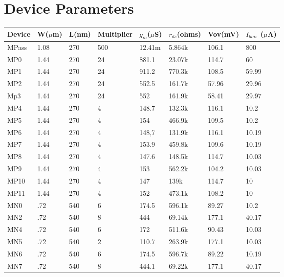 \documentclass{report}
\begin{document}
    \section{Device Parameters}
    \begin{center}
        \begin{tabular}{|m{4em}|m{3em}|m{3em}| m{4em}| m{4em}| m{4em}| m{4em} |m{4em} |}
            \hline
            Device & W($\mu$m) & L(nm) & Multiplier & $g_m$($\mu$S) & $r_{ds}$(ohms) & Vov(mV) & $I_{bias}$ ($\mu$A) \\
            \hline
            MPass & 1.08 & 270 & 500 & 12.41m & 5.864k & 106.1 & 800
            \\
            \hline
            MP0 & 1.44 & 270 & 24 & 881.1 & 23.07k & 114.7 & 60
            \\
            \hline
            MP1 & 1.44 & 270 & 24 & 911.2 & 770.3k & 108.5 & 59.99
            \\
            \hline
            MP2 & 1.44 & 270 & 24 & 552.5 & 161.7k & 57.96 & 29.96
            \\
            \hline
            Mp3 & 1.44 & 270 & 24 & 552 & 161.9k & 58.41 & 29.97
            \\
            \hline
            MP4 & 1.44 & 270 & 4 & 148.7 & 132.3k & 116.1 & 10.2
            \\
            \hline
            MP5 & 1.44 & 270 & 4 & 154 & 466.9k & 109.5 & 10.2
            \\
            \hline
            MP6 & 1.44 & 270 & 4 & 148,7 & 131.9k & 116.1 & 10.19
            \\
            \hline
            MP7 & 1.44 & 270 & 4 & 153.9 & 459.8k & 109.6 & 10.19
            \\
            \hline
            MP8 & 1.44 & 270 & 4 & 147.6 & 148.5k & 114.7 & 10.03
            \\
            \hline
            MP9 & 1.44 & 270 & 4 & 153 & 562.2k & 104.2 & 10.03
            \\
            \hline
            MP10 & 1.44 & 270 & 4 & 147 & 139k & 114.7 & 10
            \\
            \hline
            MP11 & 1.44 & 270 & 4 & 152 & 473.1k & 108.2 & 10
            \\
            \hline
            MN0 & .72 & 540 & 6 & 174.5 & 596.1k & 89.27 & 10.2
            \\
            \hline
            MN2 & .72 & 540 & 8 & 444 & 69.14k & 177.1 & 40.17
            \\
            \hline
            MN4 & .72 & 540 & 6 & 172 & 511.6k & 90.43 & 10.03
            \\
            \hline
            MN5 & .72 & 540 & 2 & 110.7 & 263.9k & 177.1 & 10.03
            \\
            \hline
            MN6 & .72 & 540 & 6 & 174.5 & 596.7k & 89.22 & 10.19
            \\
            \hline
            MN7 & .72 & 540 & 8 & 444.1 & 69.22k & 177.1 & 40.17
            \\
            \hline
        \end{tabular}
    \end{center}
    
\end{document}
